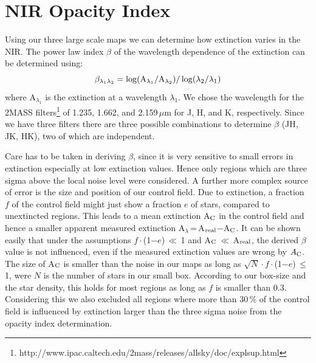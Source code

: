 \documentclass{aa}
\begin{document}
\section{NIR Opacity Index}
\label{beta_cal}

Using our three large scale maps we can determine how extinction varies in the
NIR. The power law index $\beta$ of the wavelength dependence of the extinction
can be determined using:
\begin{equation} 
\beta_{\lambda_1 \lambda_2} = \log ({\rm A}_{\lambda_1} / {\rm A}_{\lambda_2})
/ \log (\lambda_2 / \lambda_1) 
\end{equation}
where A$_{\lambda_1}$ is the extinction at a wavelength $\lambda_1$. We chose
the wavelength for the 2MASS
filters\footnote{http://www.ipac.caltech.edu/2mass/releases/allsky/doc/explsup.html}
of 1.235, 1.662, and 2.159\,$\mu$m for J, H, and K, respectively. Since we have
three filters there are three possible combinations to determine $\beta$ (JH,
JK, HK), two of which are independent. 

Care has to be taken in deriving $\beta$, since it is very sensitive to small
errors in extinction especially at low extinction values. Hence only regions
which are three sigma above the local noise level were considered. A further
more complex source of error is the size and position of our control field. Due
to extinction, a fraction $f$ of the control field might just show a fraction
$e$ of stars, compared to unextincted regions. This leads to a mean extinction
A$_{\rm C}$ in the control field and hence a smaller apparent measured
extinction A$_\lambda$\,=\,A$_{\rm real}$$-$A$_{\rm C}$. It can be shown easily
that under the assumptions $f$\,$\cdot$\,(1$-$$e$)\,$\ll$\,1 and A$_{\rm
C}$\,$\ll$\,A$_{\rm real}$, the derived $\beta$ value is not influenced, even
if the measured extinction values are wrong by $A_{\rm C}$. The size of A$_{\rm
C}$ is smaller than the noise in our maps as long as
$\sqrt{N}$\,$\cdot$\,$f$\,$\cdot$\,(1$-$$e$)\,$\le$\,1, were $N$ is the number
of stars in our small box. According to our box-size and the star density, this
holds for most regions as long as $f$ is smaller than 0.3. Considering this we
also excluded all regions where more than 30\,\% of the control field is
influenced by extinction larger than the three sigma noise from the opacity
index determination.
\end{document}
